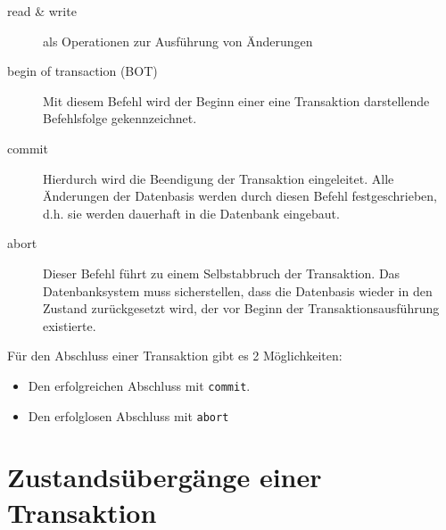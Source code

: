 \documentclass{lehramt-informatik}
\begin{document}
\begin{description}
\item[read \& write]

als Operationen zur Ausführung von Änderungen

\item[begin of transaction (BOT)]

Mit diesem Befehl wird der Beginn einer eine Transaktion darstellende
Befehlsfolge gekennzeichnet.

\item[commit]

Hierdurch wird die Beendigung der Transaktion eingeleitet. Alle
Änderungen der Datenbasis werden durch diesen Befehl festgeschrieben,
d.h. sie werden dauerhaft in die Datenbank eingebaut.

\item[abort]

Dieser Befehl führt zu einem Selbstabbruch der Transaktion. Das
Datenbanksystem muss sicherstellen, dass die Datenbasis wieder in den
Zustand zurückgesetzt wird, der vor Beginn der Transaktionsausführung
existierte.
\end{description}

Für den Abschluss einer Transaktion gibt es 2 Möglichkeiten:

\begin{itemize}
\item Den erfolgreichen Abschluss mit \texttt{commit}.
\item Den erfolglosen Abschluss mit \texttt{abort}
\end{itemize}

%

\section{Zustandsübergänge einer Transaktion}

\begin{quellen}
\item \cite[Kapitel 9.7, Seite 301]{kemper}
\item \cite[Seite 5]{db:fs:5}
\end{quellen}
\end{document}
